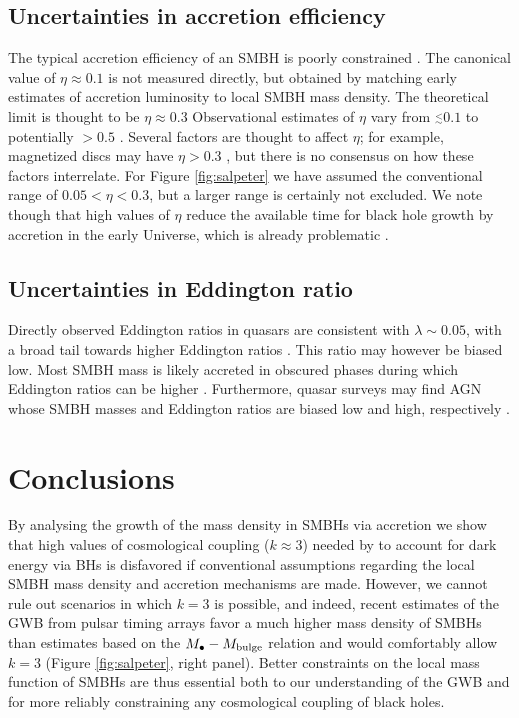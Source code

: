 \documentclass[twocolumn]{aastex631}
\begin{document}
\subsection{Uncertainties in accretion efficiency}
The typical accretion efficiency of an SMBH is poorly constrained \citep[e.g.][]{raimundo12}. The canonical value of $\eta\approx 0.1$ \citep[e.g.][]{1982MNRAS.200..115S} is not measured directly, but  obtained by matching early estimates of accretion luminosity to local SMBH mass density.
The theoretical limit is thought to be $\eta\approx0.3$ \citep{1974ApJ...191..507T} 
Observational estimates of $\eta$ vary from $\stackrel{<}{_{\sim}} 0.1$ to potentially $>0.5$ \citep[e.g.][]{trakhtenbrot14,jana22,farrah22,lai23smss}. Several factors are thought to affect $\eta$; for example, magnetized discs may have $\eta>0.3$ \citep{2016MNRAS.462..636A,Kinch_2021}, but there is no consensus on how these factors interrelate. For Figure \ref{fig:salpeter} we have assumed the conventional range of $0.05<\eta<0.3$, but a larger range is certainly not excluded. We note though that high values of $\eta$ reduce the available time for black hole growth by accretion in the early Universe, which is already problematic \citep[e.g.\ ][]{2018Natur.553..473B}.
 
\subsection{Uncertainties in Eddington ratio}
Directly observed Eddington ratios in quasars are consistent with $\lambda\sim0.05$, with a broad tail towards higher Eddington ratios \citep[e.g.][]{farrah23ellip}. 
This ratio may however be biased low. Most SMBH mass is likely
accreted in obscured phases \citep{martsan05} during which Eddington
ratios can be higher \citep{2014ApJ...785...19T,farrah22}. 
Furthermore, quasar surveys may find AGN whose SMBH masses and 
Eddington ratios are biased low and high, respectively \citep[e.g.][]{2008ApJ...680..169S}. 



\section{Conclusions}\label{sec:conc}

By analysing the growth of the mass density in SMBHs via accretion we show that high values of cosmological coupling ($k\approx 3$) needed by \citet{2023ApJ...944L..31F} to account for dark energy via BHs is disfavored if conventional assumptions regarding the local SMBH mass density and accretion mechanisms are made. However, we cannot rule out scenarios in which $k=3$ is possible, and indeed, recent estimates of the GWB from pulsar timing arrays favor a much higher mass density of SMBHs than estimates based on the $M_{\bullet}-M_{\rm bulge}$ relation and would comfortably allow $k=3$ (Figure \ref{fig:salpeter}, right panel). Better constraints on the local mass function of SMBHs are thus essential both to our understanding of the GWB and for more reliably constraining any cosmological coupling of black holes.
\end{document}
